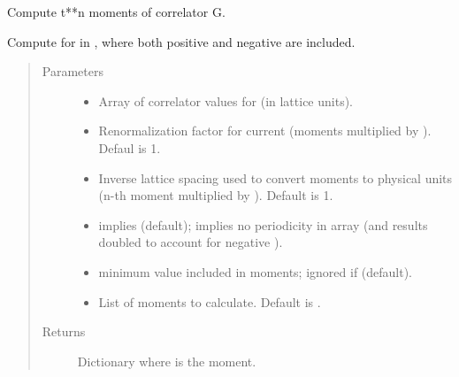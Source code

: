 \documentclass[letterpaper,10pt,english]{sphinxmanual}
\begin{document}
\begin{fulllineitems}
\label{\detokenize{g2tools:g2tools.moments}}
Compute t**n moments of correlator G.

Compute  for  in , where both positive and
negative  are included.
\begin{quote}\begin{description}
\item[{Parameters}] \leavevmode\begin{itemize}
\item {} 
 \textendash{} Array of correlator values  for  (in
lattice units).

\item {} 
 \textendash{} Renormalization factor for current (moments multiplied by ).
Defaul is 1.

\item {} 
 \textendash{} Inverse lattice spacing used to convert moments to
physical units (n-th moment multiplied by ).
Default is 1.

\item {} 
 \textendash{}  implies  (default);
 implies no periodicity in array 
(and results doubled to account for negative ).

\item {} 
 \textendash{} minimum  value included in moments; ignored
if  (default).

\item {} 
 \textendash{} List of moments to calculate. Default is
.

\end{itemize}

\item[{Returns}] \leavevmode
Dictionary  where  is the  moment.

\end{description}\end{quote}

\end{fulllineitems}
\end{document}
